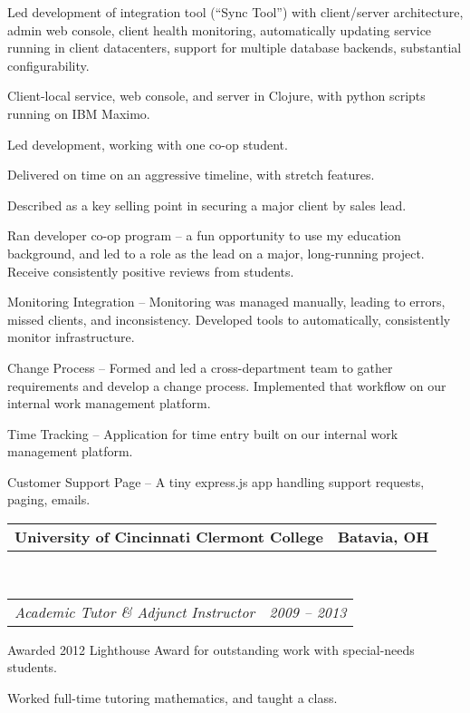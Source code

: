 \documentclass[10pt,letterpaper]{article}
\makeatletter
\newcommand{\headerrow}[2]
{\begin{tabular*}{\linewidth}{l@{\extracolsep{\fill}}r}
	#1 &
	#2 \\
\end{tabular*}}
\makeatother
\begin{document}
\begin{itemize*}
	\item Led development of integration tool (``Sync Tool'') with client/server architecture, admin web console, client health monitoring, automatically updating service running in client datacenters, support for multiple database backends, substantial configurability.
          \begin{itemize*}
          \item Client-local service, web console, and server in Clojure, with python scripts running on IBM Maximo.
          \item Led development, working with one co-op student.
          \item Delivered on time on an aggressive timeline, with stretch features.
          \item Described as a key selling point in securing a major client by sales lead.
          \end{itemize*}

          \item Ran developer co-op program -- a fun opportunity to use my education background, and led to a role as the lead on a major, long-running project.  Receive consistently positive reviews from students.
          \item Monitoring Integration -- Monitoring was managed manually, leading to errors, missed clients, and inconsistency.  Developed tools to automatically, consistently monitor infrastructure.
          \item Change Process -- Formed and led a cross-department team to gather requirements and develop a change process.  Implemented that workflow on our internal work management platform.
          \item Time Tracking -- Application for time entry built on our internal work management platform.
          \item Customer Support Page -- A tiny express.js app handling support requests, paging, emails.

	\end{itemize*}
\headerrow
    {\textbf{University of Cincinnati Clermont College}}
    {\textbf{Batavia, OH}}
    \\
    \headerrow
	{\emph{Academic Tutor \& Adjunct Instructor}}
	{\emph{2009 -- 2013}}
	\begin{itemize*}
	\item Awarded 2012 Lighthouse Award for outstanding work with special-needs students.
	\item Worked full-time tutoring mathematics, and taught a class.
	\end{itemize*}
\end{document}
